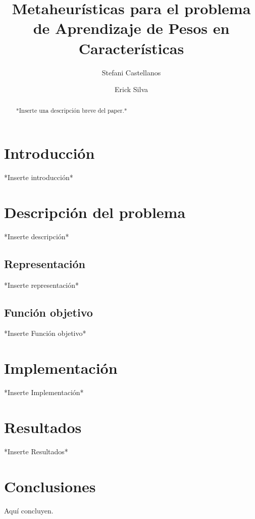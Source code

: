 \documentclass{ci5652}
\title{Metaheurísticas para el problema de Aprendizaje de Pesos en Características}
\author{Stefani Castellanos
        \and
        Erick Silva}
\begin{document}
\maketitle

\begin{abstract}
*Inserte una descripción breve del paper.*
\end{abstract}

\section*{Introducción}
*Inserte introducción*


\section{Descripción del problema}
*Inserte descripción*

\subsection{Representación}
*Inserte representación*

\subsection{Función objetivo}
*Inserte Función objetivo*

\section{Implementación}
*Inserte Implementación*

\section{Resultados}
*Inserte Resultados*

\section*{Conclusiones}

Aquí concluyen.


\small

\end{document}
